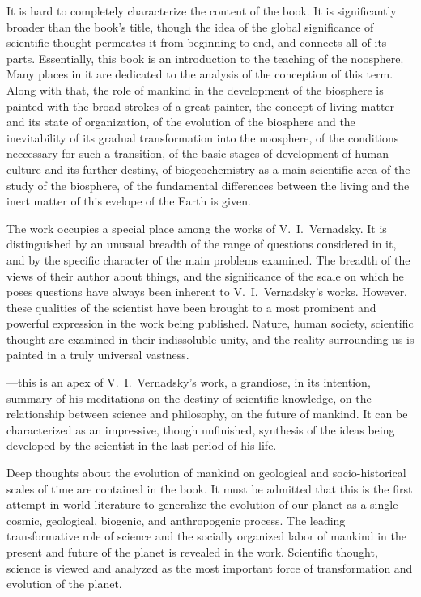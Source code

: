 It is hard to completely characterize the content of the book.  It is
significantly broader than the book's title, though the idea of the global
significance of scientific thought permeates it from beginning to end, and
connects all of its parts.  Essentially, this book is an introduction to the
teaching of the noosphere.  Many places in it are dedicated to the analysis of
the conception of this term.  Along with that, the role of mankind in the
development of the biosphere is painted with the broad strokes of a great
painter, the concept of living matter and its state of organization, of the
evolution of the biosphere and the inevitability of its gradual transformation
into the noosphere, of the conditions neccessary for such a transition, of the
basic stages of development of human culture and its further destiny, of
biogeochemistry as a main scientific area of the study of the biosphere, of the
fundamental differences between the living and the inert matter of this evelope
of the Earth is given.

The work  occupies a
special place among the works of V.~I.\ Vernadsky.  It is distinguished by an
unusual breadth of the range of questions considered in it, and by the specific
character of the main problems examined.  The breadth of the views of their
author about things, and the significance of the scale on which he poses
questions have always been inherent to V.~I.\ Vernadsky's works.  However,
these qualities of the scientist have been brought to a most prominent and
powerful expression in the work being published.  Nature, human society,
scientific thought are examined in their indissoluble unity, and the reality
surrounding us is painted in a truly universal vastness.

---this is an apex of
V.~I.\ Vernadsky's work, a grandiose, in its intention, summary of his
meditations on the destiny of scientific knowledge, on the relationship between
science and philosophy, on the future of mankind.  It can be characterized as
an impressive, though unfinished, synthesis of the ideas being developed by the
scientist in the last period of his life.

Deep thoughts about the evolution of mankind on geological and socio-historical
scales of time are contained in the book.  It must be admitted that this is the
first attempt in world literature to generalize the evolution of our planet as
a single cosmic, geological, biogenic, and anthropogenic process.  The leading
transformative role of science and the socially organized labor of mankind in
the present and future of the planet is revealed in the work.  Scientific
thought, science is viewed and analyzed as the most important force of
transformation and evolution of the planet.

